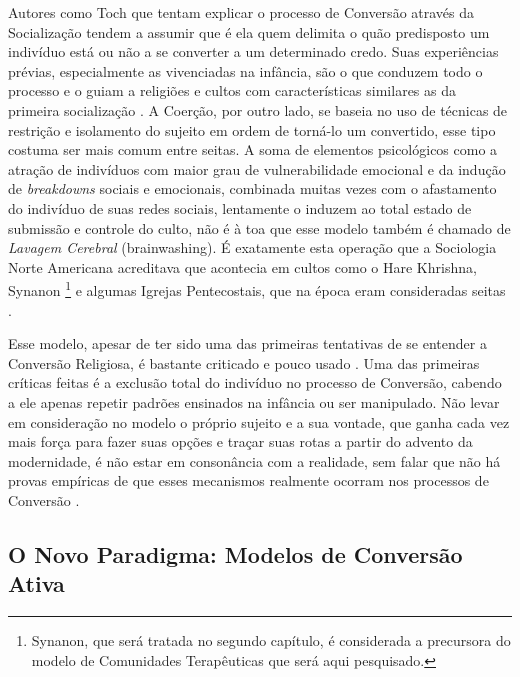 \documentclass[
	12pt,				%
	oneside,			%
	a4paper,			%
	sumario=tradicional,
	english,			%
	brazil				%
	]{abntex2}
\begin{document}
Autores como Toch \autocite*{toch_social_2013} que tentam explicar o processo de Conversão através da Socialização tendem a assumir que é ela quem delimita o quão predisposto um indivíduo está ou não a se converter a um determinado credo. Suas experiências prévias, especialmente as vivenciadas na infância, são o que conduzem todo o processo e o guiam a religiões e cultos com características similares as da primeira socialização \autocite[08]{kilbourne_paradigm_1989}. A Coerção, por outro lado, se baseia no uso de técnicas de restrição e isolamento do sujeito em ordem de torná-lo um convertido, esse tipo costuma ser mais comum entre seitas. A soma de elementos psicológicos como a atração de indivíduos com maior grau de vulnerabilidade emocional e da indução de \emph{breakdowns} sociais e emocionais, combinada muitas vezes com o afastamento do indivíduo de suas redes sociais, lentamente o induzem ao total estado de submissão e controle do culto, não é à toa que esse modelo também é chamado de \emph{Lavagem Cerebral} (brainwashing). É exatamente esta operação que a Sociologia Norte Americana acreditava que acontecia em cultos como o Hare Khrishna, Synanon \footnote{Synanon, que será tratada no segundo capítulo, é considerada a precursora do modelo de Comunidades Terapêuticas que será aqui pesquisado.} e algumas Igrejas Pentecostais, que na época eram consideradas seitas \autocite[283]{robbins_deprogramming_1982}.

Esse modelo, apesar de ter sido uma das primeiras tentativas de se entender a Conversão Religiosa, é bastante criticado e pouco usado \autocite[346]{gooren_reassessing_2007-1}. Uma das primeiras críticas feitas é a exclusão total do indivíduo no processo de Conversão, cabendo a ele apenas repetir padrões ensinados na infância ou ser manipulado. Não levar em consideração no modelo o próprio sujeito e a sua vontade, que ganha cada vez mais força para fazer suas opções e traçar suas rotas a partir do advento da modernidade, é não estar em consonância com a realidade, sem falar que não há provas empíricas de que esses mecanismos realmente ocorram nos processos de Conversão \autocite[346]{gooren_reassessing_2007-1}.

\hypertarget{o-novo-paradigma-modelos-de-conversuxe3o-ativa}{%
\subsection{O Novo Paradigma: Modelos de Conversão Ativa}\label{o-novo-paradigma-modelos-de-conversuxe3o-ativa}}
\end{document}
